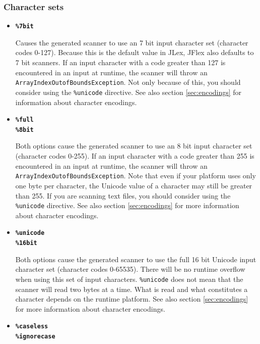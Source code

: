 \documentclass[11pt]{scrartcl}
\begin{document}
\subsubsection{Character sets\label{CharacterSets}}
\begin{itemize}
\item
{\bf \texttt{\%7bit}}

Causes the generated scanner to use an 7 bit input character set (character
codes 0-127). Because this is the default value in JLex, JFlex also defaults
to 7 bit scanners. If an input character with a code greater than 127 is
encountered in an input at runtime, the scanner will throw an \texttt{ArrayIndexOutofBoundsException}.
Not only because of this, you should consider using the \texttt{\%unicode} directive. 
See also section \ref{sec:encodings} for information about character encodings.
 
\item
{\bf \texttt{\%full}}\\
{\bf \texttt{\%8bit}}

Both options cause the generated scanner to use an 8 bit input character
set (character codes 0-255). If an input character with a code greater
than 255 is encountered in an input at runtime, the scanner will throw
an \texttt{ArrayIndexOutofBoundsException}. Note that even if your platform
uses only one byte per character, the Unicode value of a character may
still be greater than 255. If you are scanning text files, you should
consider using the \texttt{\%unicode} directive. See also section \ref{sec:encodings}
for more information about character encodings.
 
\item
{\bf \texttt{\%unicode}}\\
{\bf \texttt{\%16bit}}

Both options cause the generated scanner to use the full 16 bit Unicode input
character set (character codes 0-65535). There will be no runtime overflow when
using this set of input characters. \texttt{\%unicode} does not mean that the
scanner will read two bytes at a time. What is read and what constitutes a
character depends on the runtime platform. See also section \ref{sec:encodings}
for more information about character encodings.
 
\label{caseless}
\item
{\bf \texttt{\%caseless}}\\
{\bf \texttt{\%ignorecase}}


\end{itemize}
\end{document}

